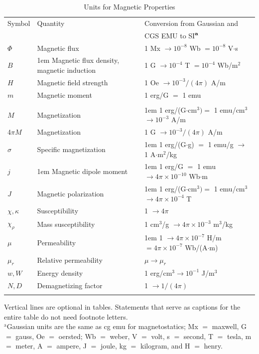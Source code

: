 \documentclass{IEEEojcsys}
\begin{document}
\begin{table}
\caption{Units for Magnetic Properties}
\label{table}
\tablefont
\begin{tabular*}{20.25pc}{@{}p{29pt}p{81pt}<{\raggedright}p{113pt}<{\raggedright}@{}}
\hline\\[-1.5pc]\hline
{Symbol}& 
\centerline{Quantity}& 
\centerline{Conversion from Gaussian and} \\[-16pt]
&&\centerline{CGS EMU to SI$^{\mathrm{\bf a}}$} \\[-16pt]
\hline
$\Phi $& 
Magnetic flux& 
1 Mx $\to  10^{-8}$ Wb $= 10^{-8}$ V$\cdot$s \\
$B$& 
\hangindent1em Magnetic flux density,   magnetic induction& 
1 G $\to  10^{-4}$ T $= 10^{-4}$ Wb/m$^{2}$ \\
$H$& 
Magnetic field strength& 
1 Oe $\to  10^{-3}/(4\pi )$ A/m \\
$m$& 
Magnetic moment& 
1 erg/G $=$ 1 emu  \\ && \hskip1em $\to 10^{-3}$ A$\cdot$m$^{2} = 10^{-3}$ J/T \\
$M$& 
Magnetization& 
\hangindent1em 1 erg/(G$\cdot$cm$^{3}) =$ 1 emu/cm$^{3}$   $\to 10^{-3}$ A/m \\
4$\pi M$& 
Magnetization& 
1 G $\to  10^{-3}/(4\pi )$ A/m \\
$\sigma $& 
Specific magnetization& 
\hangindent1em 1 erg/(G$\cdot$g) $=$ 1 emu/g $\to $ 1 A$\cdot$m$^{2}$/kg \\
$j$& 
\hangindent1em Magnetic dipole   moment& 
\hangindent1em 1 erg/G $=$ 1 emu\break   $\to 4\pi \times  10^{-10}$ Wb$\cdot$m \\
$J$& 
Magnetic polarization& 
\hangindent1em 1 erg/(G$\cdot$cm$^{3}) =$ 1 emu/cm$^{3}$  $\to 4\pi\times10^{-4}$ T \\
$\chi , \kappa $& 
Susceptibility& 
1 $\to  4\pi $ \\
$\chi_{\rho }$& 
Mass susceptibility& 
1 cm$^{3}$/g $\to  4\pi \times  10^{-3}$ m$^{3}$/kg \\
$\mu $& 
Permeability& 
\hangindent1em 1 $\to  4\pi \times  10^{-7}$ H/m   $= 4\pi \times  10^{-7}$ Wb/(A$\cdot$m) \\
$\mu_{r}$& 
Relative permeability& 
$\mu \to \mu_{r}$ \\
$w, W$& 
Energy density& 
1 erg/cm$^{3} \to  10^{-1}$ J/m$^{3}$ \\
$N, D$& 
Demagnetizing factor& 
1 $\to  1/(4\pi )$ \\
\hline\\[-1.5pc]\hline
\end{tabular*}
\begin{tabnote}
{Vertical lines are optional in tables. Statements that serve as captions for 
the entire table do not need footnote letters. }\\
{$^{\mathrm{a}}$Gaussian units are the same as cg emu for magnetostatics; Mx 
$=$ maxwell, G $=$ gauss, Oe $=$ oersted; Wb $=$ weber, V $=$ volt, s $=$ 
second, T $=$ tesla, m $=$ meter, A $=$ ampere, J $=$ joule, kg $=$ 
kilogram, and H $=$ henry.}
\end{tabnote}
\label{tab1}
\end{table}
\end{document}
